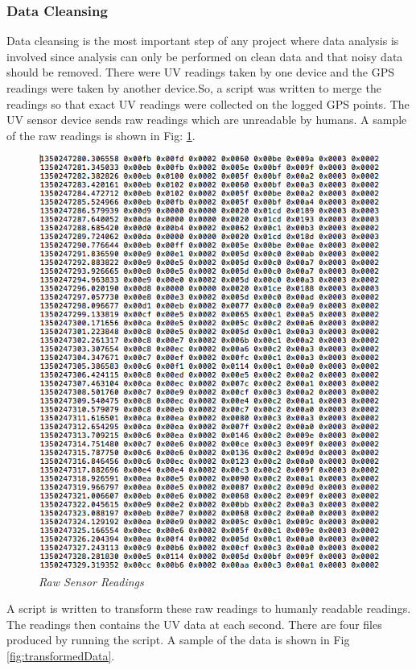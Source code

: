 \documentclass[12pt,fullpage,doublespace]{article}
\begin{document}
\subsubsection{Data Cleansing}
Data cleansing is the most important step of any project where data analysis is involved since analysis can only be performed on clean data and that noisy data should be removed. There were UV readings taken by one device and the GPS readings were taken by another device.So, a script was written to merge the readings so that exact UV readings were collected on the logged GPS points. The UV sensor device sends raw readings which are unreadable by humans. A sample of the raw readings is shown in Fig: \ref{fig:rawReadings}.\begin{figure}
\begin{center}
\includegraphics[scale=0.45]{rawReadings.png}
\caption{\small \sl Raw Sensor Readings\label{fig:rawReadings}}
\end{center}
\end{figure} A script  is written to transform these raw readings to humanly readable readings. The readings then contains the UV data at each second. There are four files produced by running the script. A sample of the data is shown in Fig \ref{fig:transformedData}.\begin{figure}

\end{figure}
\end{document}
